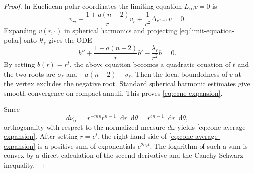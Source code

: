 \documentclass[12pt]{amsart}
\theoremstyle{plain}
\theoremstyle{definition}
\theoremstyle{remark}     %
\numberwithin{equation}{section}
\newcommand{\dd}{\mathop{}\!\mathrm{d}}%
\begin{document}
\begin{proof}
In Euclidean polar coordinates the limiting equation
$L_\infty v=0$ is
\begin{equation}\label{eq:limit-equation-polar}
    v_{rr}
    +\frac{1+a(n-2)}{r}v_r
    +\frac1{r^2}\Delta_{\mathbb S^{n-1}}v=0.
\end{equation}
Expanding $v(r,\cdot)$ in spherical harmonics and projecting
\cref{eq:limit-equation-polar} onto $\mathcal Y_\ell$ gives the 
ODE
\[
    b''+\frac{1+a(n-2)}r b'
    -\frac{\lambda_\ell}{r^2}b=0.
\]
By setting $b(r)=r^t$, the above equation becomes a  quadratic equation of $t$ and the two roots are $\sigma_\ell$ and
$-a(n-2)-\sigma_\ell$. Then the local boundedness of $v$ at the vertex excludes the negative root. 
Standard spherical harmonic estimates give smooth
convergence on compact annuli.
This proves \cref{eq:cone-expansion}.

Since
\[
    d\nu_\infty
    =r^{-mn}r^{n-1}\dd r\dd \theta
    =r^{an-1}\dd r\dd \theta,
\]
orthogonality with respect to the normalized measure $d\omega$ yields
\cref{eq:cone-average-expansion}.  After setting $r=e^t$, the right-hand
side of \cref{eq:cone-average-expansion} is a positive sum of exponentials $e^{2\sigma_\ell t}$.  The logarithm
of such a sum is convex by a direct  calculation of the second derivative and the Cauchy-Schwarz inequality.
\end{proof}
\end{document}
